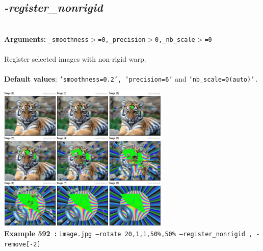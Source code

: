 \documentclass[a4paper,11pt,twoside]{book}
\begin{document}
\subsection{\emph{-register\_nonrigid} }\vspace*{-0.5em}
~\\\textbf{Arguments: } 
{\small \texttt{\_smoothness$>$=0,\_precision$>$0,\_nb\_scale$>$=0}}\\~\\
Register selected images with non-rigid warp.
~\\~\\\textbf{Default values}: {\small \texttt{'smoothness=0.2', 'precision=6'} and \texttt{'nb\_scale=0(auto)'.}}
\begin{center}\includegraphics[keepaspectratio=true,height=7cm,width=\textwidth]{img/gmic_def592.jpg}\\
{\footnotesize \textbf{Example 592~:} \texttt{image.jpg --rotate 20,1,1,50\%,50\% --register\_nonrigid , -remove[-2]}}
\end{center}
\end{document}
